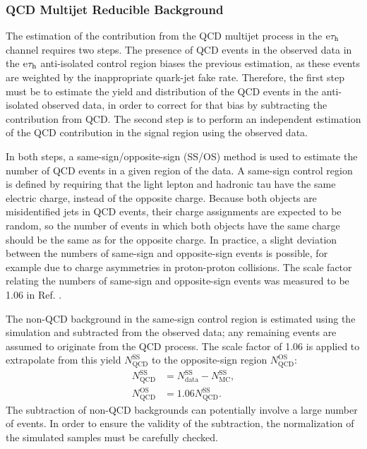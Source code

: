 \documentclass[12pt]{thesis}  %
\newcommand{\tauh}{\ensuremath{\tau_{\text{h}}}\xspace}
\newcommand{\Pe}{\ensuremath{\cmsSymbolFace{e}}\xspace}
\newcommand{\etau}{\ensuremath{\Pe\tauh}\xspace}
\begin{document}
\subsubsection{QCD Multijet Reducible Background}
\label{sec:qcdbkg}

The estimation of the contribution from the QCD multijet process in the \etau channel requires two steps. The presence of QCD events in the observed data in the \etau anti-isolated control region biases the previous estimation, as these events are weighted by the inappropriate quark-jet fake rate. Therefore, the first step must be to estimate the yield and \pt distribution of the QCD events in the anti-isolated observed data, in order to correct for that bias by subtracting the contribution from QCD. The second step is to perform an independent estimation of the QCD contribution in the signal region using the observed data.

In both steps, a same-sign/opposite-sign (SS/OS) method is used to estimate the number of QCD events in a given region of the data. A same-sign control region is defined by requiring that the light lepton and hadronic tau have the same electric charge, instead of the opposite charge. Because both objects are misidentified jets in QCD events, their charge assignments are expected to be random, so the number of events in which both objects have the same charge should be the same as for the opposite charge. In practice, a slight deviation between the numbers of same-sign and opposite-sign events is possible, for example due to charge asymmetries in proton-proton collisions. The scale factor relating the numbers of same-sign and opposite-sign events was measured to be 1.06 in Ref. \cite{CMS-AN-2013-178}.

The non-QCD background in the same-sign control region is estimated using the simulation and subtracted from the observed data; any remaining events are assumed to originate from the QCD process. The scale factor of 1.06 is applied to extrapolate from this yield $N_{\text{QCD}}^{\text{SS}}$ to the opposite-sign region $N_{\text{QCD}}^{\text{OS}}$:
\begin{align}
N_{\text{QCD}}^{\text{SS}} & = N_{\text{data}}^{\text{SS}} - N_{\text{MC}}^{\text{SS}}, \label{bkg:QCDss}\\
N_{\text{QCD}}^{\text{OS}} & = 1.06 N_{\text{QCD}}^{\text{SS}}. \label{bkg:QCDos}
\end{align}
The subtraction of non-QCD backgrounds can potentially involve a large number of events. In order to ensure the validity of the subtraction, the normalization of the simulated samples must be carefully checked.
\end{document}
